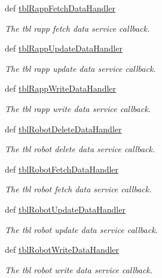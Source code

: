\begin{DoxyCompactItemize}
def \hyperlink{classmysql__wrapper__old_1_1MySQLdbWrapper_acd27420dd59fe49170d1db424841cffa}{tbl\-Rapp\-Fetch\-Data\-Handler}
\begin{DoxyCompactList}\small\item\em The tbl rapp fetch data service callback. \end{DoxyCompactList}\item 
def \hyperlink{classmysql__wrapper__old_1_1MySQLdbWrapper_a8c4a153d77443c0c305ec83b0afd4a2a}{tbl\-Rapp\-Update\-Data\-Handler}
\begin{DoxyCompactList}\small\item\em The tbl rapp update data service callback. \end{DoxyCompactList}\item 
def \hyperlink{classmysql__wrapper__old_1_1MySQLdbWrapper_aa2f0e7bb6dff6009e36688c67e2832c6}{tbl\-Rapp\-Write\-Data\-Handler}
\begin{DoxyCompactList}\small\item\em The tbl rapp write data service callback. \end{DoxyCompactList}\item 
def \hyperlink{classmysql__wrapper__old_1_1MySQLdbWrapper_a4882c31e92609bb2cbb4ce7c83e47e05}{tbl\-Robot\-Delete\-Data\-Handler}
\begin{DoxyCompactList}\small\item\em The tbl robot delete data service callback. \end{DoxyCompactList}\item 
def \hyperlink{classmysql__wrapper__old_1_1MySQLdbWrapper_a4f487c963b05227bd072b7f3fc5f9e2a}{tbl\-Robot\-Fetch\-Data\-Handler}
\begin{DoxyCompactList}\small\item\em The tbl robot fetch data service callback. \end{DoxyCompactList}\item 
def \hyperlink{classmysql__wrapper__old_1_1MySQLdbWrapper_a5b8b5993bc3fc5f82d45bcd8f230f985}{tbl\-Robot\-Update\-Data\-Handler}
\begin{DoxyCompactList}\small\item\em The tbl robot update data service callback. \end{DoxyCompactList}\item 
def \hyperlink{classmysql__wrapper__old_1_1MySQLdbWrapper_aedfbd1247d45f1af6089300ac4d9ee9e}{tbl\-Robot\-Write\-Data\-Handler}
\begin{DoxyCompactList}\small\item\em The tbl robot write data service callback. \end{DoxyCompactList}\item 

\end{DoxyCompactItemize}
